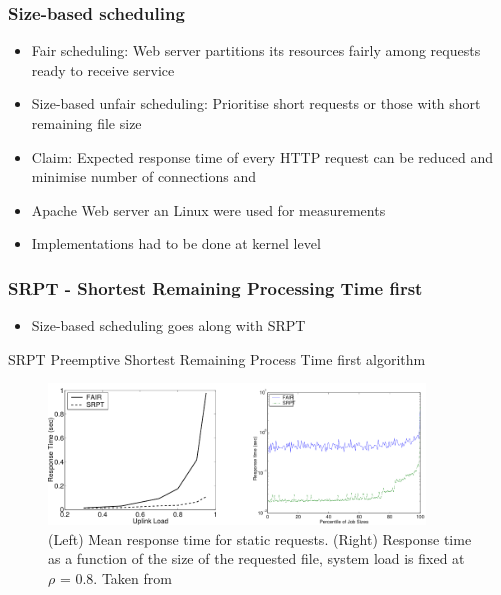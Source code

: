 \documentclass[9pt]{beamer}
\begin{document}
\begin{frame}
\frametitle<presentation>{Size-based scheduling}

  \begin{itemize}
    \item Fair scheduling: Web server partitions its resources fairly among requests ready to receive service
    \item Size-based unfair scheduling: Prioritise short requests or those with short remaining file size
    \item Claim: Expected response time of every HTTP request can be reduced and minimise number of connections\cite{schroederSize} and \cite{schorederSchedule}
    \item Apache Web server an Linux were used for measurements
    \item Implementations had to be done at kernel level
    \end{itemize}
  
\end{frame}

\begin{frame}[fragile]
\frametitle<presentation>{SRPT - Shortest Remaining Processing Time first}
  \begin{itemize}
    \item Size-based scheduling goes along with SRPT
  \end{itemize}
  
  \begin{block}{SRPT}
    Preemptive Shortest Remaining Process Time first algorithm
  \end{block}
  
\begin{figure}[h]
\centerline{\includegraphics[width=10cm]{pics/srpt.pdf}}
\caption{(Left) Mean response time for static requests. (Right) Response time as a function of the size of the requested file, system load is fixed at
$\rho$ = 0.8. Taken from \cite{schorederSchedule}}
\label{fig-srpt}
\end{figure}

\end{frame}
\end{document}

